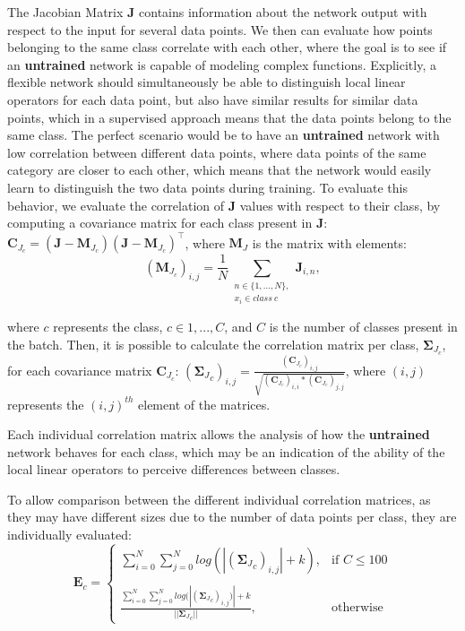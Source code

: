 \documentclass[10pt, conference]{IEEEtran}
\newcommand{\matr}[1]{\mathbf{#1}}
\begin{document}
The Jacobian Matrix $\matr{J}$ contains information about the network output with respect to the input for several data points. We then can evaluate how points belonging to the same class correlate with each other, where the goal is to see if an \textbf{untrained} network is capable of modeling complex functions. Explicitly, a flexible network should simultaneously be able to distinguish local linear operators for each data point, but also have similar results for similar data points, which in a supervised approach means that the data points belong to the same class. The perfect scenario would be to have an \textbf{untrained} network with low correlation between different data points, where data points of the same category are closer to each other, which means that the network would easily learn to distinguish the two data points during training. To evaluate this behavior, we evaluate the correlation of $\matr{J}$ values with respect to their class, by computing a covariance matrix for each class present in $\matr{J}$: $\matr{C}_{J_c} = (\matr{J} - \matr{M}_{J_c})(\matr{J}-\matr{M}_{J_c})^\top$, where $\matr{M}_J$ is the matrix with elements: \begin{equation*}
    (\matr{M}_{J_c})_{i,j}=\frac{1}{N}
\sum_{\substack{n\in\{1,\ldots,N\},\\ x_i \in class~c}}
\matr{J}_{i,n},
\end{equation*}


\noindent where $c$ represents the class, $c \in 1, ..., C$, and $C$ is the number of classes present in the batch. Then, it is possible to calculate the correlation matrix per class, $\matr{\Sigma}_{J_c}$, for each covariance matrix $\matr{C}_{J_c}$: $({{\matr{\Sigma}_J}_c})_{i,j} = \frac{(\matr{C}_{J_c})_{i,j}}{\sqrt{(\matr{C}_{J_c})_{i,i} * (\matr{C}_{J_c})_{j,j}}}$, where $(i,j)$ represents the $(i,j)^{th}$ element of the matrices.

Each individual correlation matrix allows the analysis of how the \textbf{untrained} network behaves for each class, which may be an indication of the ability of the local linear operators to perceive differences between classes.

To allow comparison between the different individual correlation matrices, as they may have different sizes due to the number of data points per class, they are individually evaluated:
\begin{equation*}
    \matr{E}_c =  
    \begin{cases}
        \sum_{i=0}^{N}\sum_{j=0}^{N} log(|({{\matr{\Sigma}_J}_c})_{i,j}|+k), & \text{if }C \leq 100\\\\
        \frac{\sum_{i=0}^{N}\sum_{j=0}^{N} log(|({{\matr{\Sigma}_J}_c})_{i,j})|+k}{||{{\matr{\Sigma}_J}_c}||}, & \text{otherwise}
    \end{cases}
\end{equation*}
\end{document}
